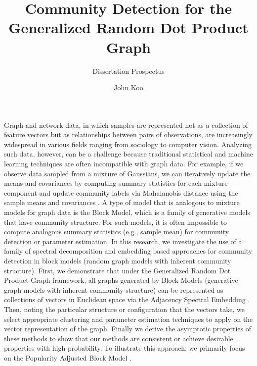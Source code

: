 \documentclass[
  11pt,
]{article}
\title{Community Detection for the\\
Generalized Random Dot Product Graph}
\subtitle{Dissertation Prospectus}
\author{John Koo}
\date{}
\begin{document}
\maketitle

\newcommand{\diag}{\text{diag}}
\newcommand{\tr}{\text{Tr}}
\newcommand{\blockdiag}{\text{blockdiag}}
\newcommand{\indep}{\stackrel{\text{ind}}{\sim}}
\newcommand{\iid}{\stackrel{\text{iid}}{\sim}}
\newcommand{\Bernoulli}{\text{Bernoulli}}
\newcommand{\Betadist}{\text{Beta}}
\newcommand{\BG}{\text{BernoulliGraph}}
\newcommand{\Cat}{\text{Categorical}}
\newcommand{\GRDPG}{\text{GRDPG}}
\newtheorem{definition}{Definition}
\newtheorem{theorem}{Theorem}
\newtheorem{lemma}{Lemma}
\theoremstyle{remark}
\newtheorem*{remark}{Remark}
\theoremstyle{example}
\newtheorem*{example}{Example}

Graph and network data, in which samples are represented not as a
collection of feature vectors but as relationships between pairs of
observations, are increasingly widespread in various fields ranging from
sociology to computer vision. Analyzing such data, however, can be a
challenge because traditional statistical and machine learning
techniques are often incompatible with graph data. For example, if we
observe data sampled from a mixture of Gaussians, we can iteratively
update the means and covariances by computing summary statistics for
each mixture component and update community labels via Mahalanobis
distance using the sample means and covariances
\cite{doi:10.1198/016214502760047131}. A type of model that is analogous
to mixture models for graph data is the Block Model, which is a family
of generative models that have community structure. For such models, it
is often impossible to compute analogous summary statistics (e.g.,
sample mean) for community detection or parameter estimation. In this
research, we investigate the use of a family of spectral decomposition
and embedding based approaches for community detection in block models
(random graph models with inherent community structure). First, we
demonstrate that under the Generalized Random Dot Product Graph
\cite{rubindelanchy2017statistical} framework, all graphs generated by
Block Models (generative graph models with inherent community structure)
can be represented as collections of vectors in Euclidean space via the
Adjacency Spectral Embedding
\cite{athreya2017statistical, lyzinski2014}. Then, noting the particular
structure or configuration that the vectors take, we select appropriate
clustering and parameter estimation techniques to apply on the vector
representation of the graph. Finally we derive the asymptotic properties
of these methods to show that our methods are consistent or achieve
desirable properties with high probability. To illustrate this approach,
we primarily focus on the Popularity Adjusted Block Model
\cite{307cbeb9b1be48299388437423d94bf1}.
\end{document}
